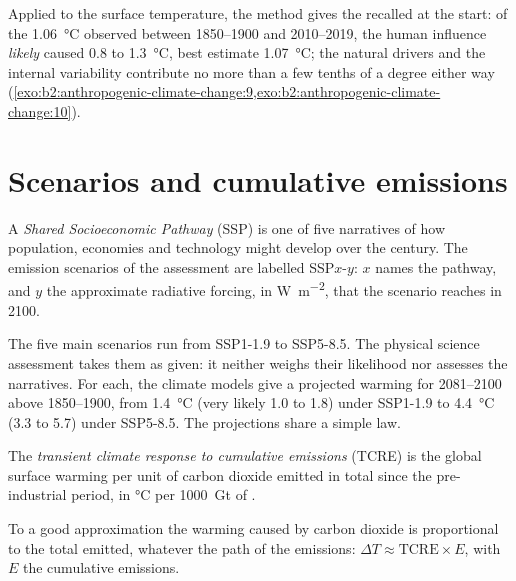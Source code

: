 Applied to the surface temperature, the method gives the  recalled at the start: of the
\qty{1.06}{\celsius} observed between 1850--1900 and 2010--2019, the human influence \emph{likely}
caused 0.8 to \qty{1.3}{\celsius}, best estimate \qty{1.07}{\celsius}; the natural drivers and the
internal variability contribute no more than a few tenths of a degree either way
(\cref{exo:b2:anthropogenic-climate-change:9,exo:b2:anthropogenic-climate-change:10}).

\section{Scenarios and cumulative emissions}\label{sec:b2:anthropogenic-climate-change:scenarios}

\begin{definition}\label{def:b2:anthropogenic-climate-change:ssp}
A \emph{Shared Socioeconomic Pathway} (SSP) is one of five
narratives of how population, economies and technology might develop over the century. The
emission scenarios of the assessment are labelled SSP$x$-$y$: $x$ names the pathway, and $y$ the
approximate radiative forcing, in \unit{W.m^{-2}}, that the scenario reaches in 2100.
\end{definition}

The five main scenarios run from SSP1-1.9 to SSP5-8.5. The physical science assessment takes them as
given: it neither weighs their likelihood nor assesses the narratives. For each, the climate models
give a projected warming for 2081--2100 above 1850--1900, from \qty{1.4}{\celsius} (very likely 1.0
to 1.8) under SSP1-1.9 to \qty{4.4}{\celsius} (3.3 to 5.7) under SSP5-8.5. The projections share a
simple law.

\begin{definition}\label{def:b2:anthropogenic-climate-change:tcre}
The \emph{transient climate response to cumulative  emissions} (TCRE) is the global surface warming per unit of carbon
dioxide emitted in total since the pre-industrial period, in \unit{\celsius} per
\qty{1000}{Gt} of .
\end{definition}

\begin{proposition}\label{prop:b2:anthropogenic-climate-change:tcre}
To a good approximation the warming caused by carbon dioxide is proportional to the total emitted,
whatever the path of the emissions: $\Delta T \approx \text{TCRE} \times E$, with $E$ the cumulative
emissions.
\end{proposition}
\admitted

